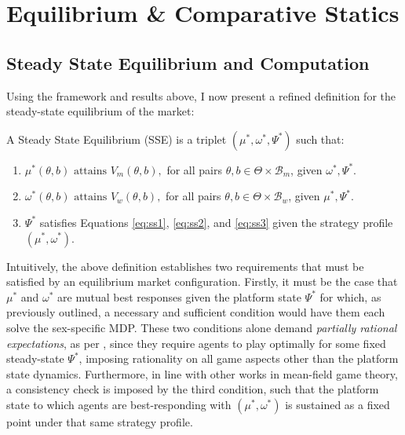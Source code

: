 \section{Equilibrium \& Comparative Statics}
\label{sec:section3} 
\subsection{Steady State Equilibrium and Computation}\label{sec:section3.1} 
Using the framework and results above, I now present a refined definition for the steady-state equilibrium of the market: 
\begin{definition}
    A Steady State Equilibrium (SSE) is a triplet $(\mu^*, \omega^*, \Psi^*)$ such that:
    \begin{enumerate}
        \item $ \mu^*(\theta,b) \text{ attains } V_m(\theta,b),$ for all pairs $\theta, b \in \Theta \times \mathcal{B}_m$, given $\omega^*,\Psi^*$.
        \item $ \omega^*(\theta,b) \text{ attains } V_w(\theta,b),$ for all pairs $\theta, b \in \Theta \times \mathcal{B}_w$, given $\mu^*,\Psi^*$.
        \item $\Psi^*$ satisfies Equations \ref{eq:ss1}, \ref{eq:ss2}, and \ref{eq:ss3} given the strategy profile $(\mu^*, \omega^*)$.
    \end{enumerate} 
\end{definition}

Intuitively, the above definition establishes two requirements that must be satisfied by an equilibrium market configuration. 
Firstly, it must be the case that $\mu^*$ and $\omega^*$ are mutual best responses given the platform state $\Psi^*$ for which, as previously outlined, a necessary and sufficient condition would have them each solve the sex-specific MDP. 
These two conditions alone demand \textit{partially rational expectations}, as per \cite{burdett1997marriage}, since they require agents to play optimally for some fixed steady-state $\Psi^*$, imposing rationality on all game aspects other than the platform state dynamics. 
Furthermore, in line with other works in mean-field game theory, a consistency check is imposed by the third condition, such that the platform state to which agents are best-responding with $(\mu^*,\omega^*)$ is sustained as a fixed point under that same strategy profile.

